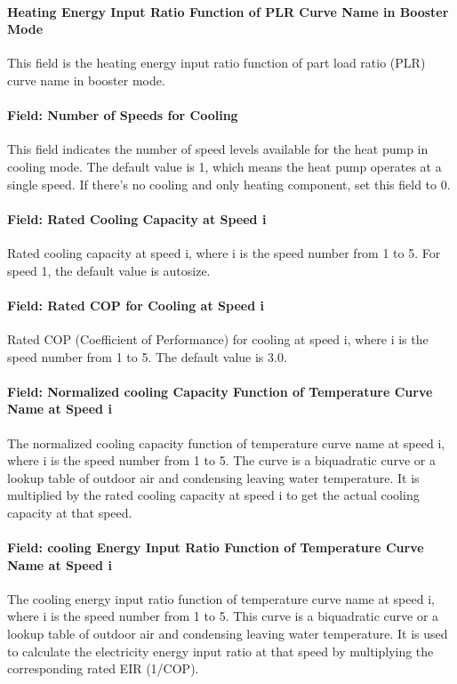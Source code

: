 \paragraph{Heating Energy Input Ratio Function of PLR Curve Name in Booster
Mode} This field is the heating energy input ratio function of part load ratio
(PLR) curve name in booster mode.
\paragraph{Field: Number of Speeds for Cooling} This field indicates the number
of speed levels available for the heat pump in cooling mode. The default value
is 1, which means the heat pump operates at a single speed. If there's no
cooling and only heating component, set this field to 0.
\paragraph{Field: Rated Cooling Capacity at Speed i} Rated cooling capacity at
speed i, where i is the speed number from 1 to 5. For speed 1, the default value
is autosize.
\paragraph{Field: Rated COP for Cooling at Speed i} Rated COP (Coefficient of
Performance) for cooling at speed i, where i is the speed number from 1 to 5.
The default value is 3.0.
\paragraph{Field: Normalized cooling Capacity Function of Temperature Curve Name
at Speed i} The normalized cooling capacity function of temperature curve name
at speed i, where i is the speed number from 1 to 5. The curve is a biquadratic
curve or a lookup table of outdoor air and condensing leaving water temperature.
It is multiplied by the rated cooling capacity at speed i to get the actual
cooling capacity at that speed.
\paragraph{Field: cooling Energy Input Ratio Function of Temperature Curve Name
at Speed i} The cooling energy input ratio function of temperature curve name at
speed i, where i is the speed number from 1 to 5. This curve is a biquadratic
curve or a lookup table of outdoor air and condensing leaving water temperature.
It is used to calculate the electricity energy input ratio at that speed by
multiplying the corresponding rated EIR (1/COP).
